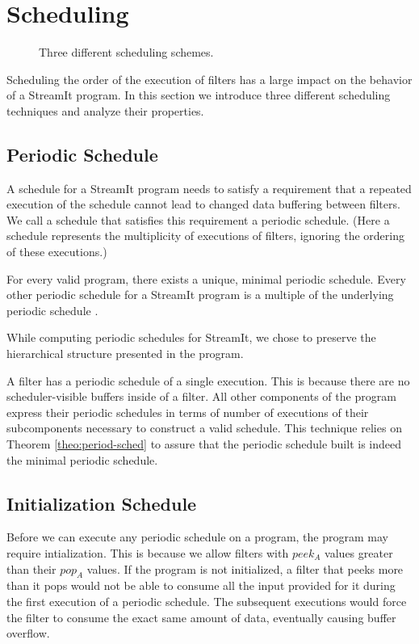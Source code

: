 \section{Scheduling}

\begin{figure}
\centering
\caption{Three different scheduling schemes.}
\label{fig:sched}

\end{figure}

Scheduling the order of the execution of filters has a large impact on 
the behavior of a StreamIt program.  In this section we introduce three
different scheduling techniques and analyze their properties.

\subsection{Periodic Schedule}
A schedule for a StreamIt program needs to satisfy a requirement that
a repeated execution of the schedule cannot lead to changed data
buffering between filters.  We call a schedule that satisfies this
requirement a periodic schedule.  (Here a schedule represents the
multiplicity of executions of filters, ignoring the ordering of these
executions.)

For every valid program, there exists a unique, minimal periodic
schedule.  Every other periodic schedule for a StreamIt program is a
multiple of the underlying periodic schedule \cite{bhat1994x3}.

While computing periodic schedules for StreamIt, we chose to preserve the
hierarchical structure presented in the program.

A filter has a periodic schedule of a single execution.  This is because
there are no scheduler-visible buffers inside of a filter.  All other
components of the program express their periodic schedules in terms of
number of executions of their subcomponents necessary to construct a valid
schedule.  This technique relies on Theorem \ref{theo:period-sched} to
assure that the periodic schedule built is indeed the minimal periodic
schedule.

\subsection{Initialization Schedule}

Before we can execute any periodic schedule on a program, the program may
require intialization.  This is because we allow filters with $peek_A$ values
greater than their $pop_A$ values.  If the program is not initialized, a filter
that peeks more than it pops would not be able to consume all the input 
provided for it during the first execution of a periodic schedule.  The
subsequent executions would force the filter to consume the exact same amount
of data, eventually causing buffer overflow.

